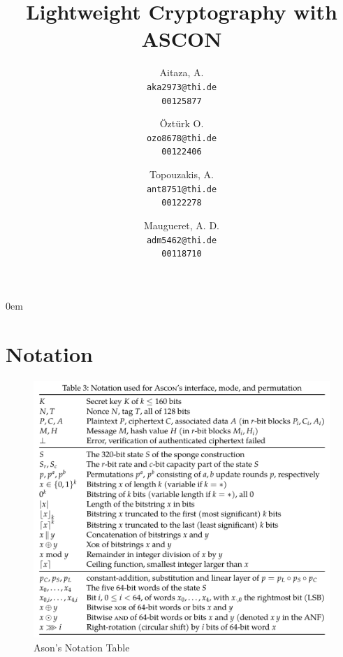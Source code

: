 \documentclass[a4paper]{article}
\begin{document}
\begin{titlepage}

  \title{ \Huge Lightweight Cryptography with ASCON}
  \author{
    Aitaza, A. \\
    \texttt{aka2973@thi.de} \\
    \texttt{00125877}
    \and
    Öztürk O.\\
    \texttt{ozo8678@thi.de} \\
    \texttt{00122406}   
    \and
    Topouzakis, A. \\
    \texttt{ant8751@thi.de} \\
    \texttt{00122278}
    \and
    Maugueret, A. D.\\
    \texttt{adm5462@thi.de} \\
    \texttt{00118710}
    }
  \clearpage\maketitle
  \thispagestyle{empty}

\end{titlepage}

\restoregeometry

\newpage
\tableofcontents
\newpage
\listoffigures
\newpage
{} 

\topmargin-20mm
\hoffset-15mm
\textwidth15.5cm
\parindent0em

\thispagestyle{empty}
\section{Notation}

\begin{figure}[H] 
    \centering 
    \includegraphics[width=1\textwidth]{figures/ascon-notation.png}
    \caption{Ason's Notation Table \cite{DBLP:journals/joc/DobraunigEMS21}}
    \label{fig:ascon-notation} 
  \end{figure}








\newpage
\printbibliography
\newpage


\end{document}
